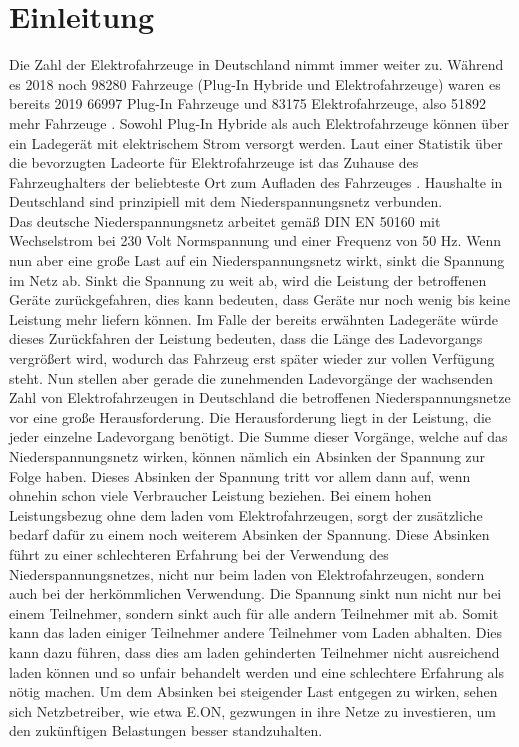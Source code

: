 \chapter{Einleitung}

Die Zahl der Elektrofahrzeuge in Deutschland nimmt immer weiter zu. Während es 2018 noch 98280 Fahrzeuge (Plug-In Hybride und Elektrofahrzeuge) waren es bereits 2019 66997 Plug-In Fahrzeuge und 83175 Elektrofahrzeuge, also 51892 mehr Fahrzeuge \cite{intro_stat_1}. Sowohl Plug-In Hybride als auch Elektrofahrzeuge können über ein Ladegerät mit elektrischem Strom versorgt werden. Laut einer Statistik über die bevorzugten Ladeorte für Elektrofahrzeuge ist das Zuhause des Fahrzeughalters der beliebteste Ort zum Aufladen des Fahrzeuges \cite{intro_stat_2}. Haushalte in Deutschland sind prinzipiell mit dem Niederspannungsnetz verbunden. \\
Das deutsche Niederspannungsnetz arbeitet gemäß DIN EN 50160 mit Wechselstrom bei 230 Volt Normspannung und einer Frequenz von 50 Hz. Wenn nun aber eine große Last auf ein Niederspannungsnetz wirkt, sinkt die Spannung im Netz ab. Sinkt die Spannung zu weit ab, wird die Leistung der betroffenen Geräte zurückgefahren, dies kann bedeuten, dass Geräte nur noch wenig bis keine Leistung mehr liefern können. Im Falle der bereits erwähnten Ladegeräte würde dieses Zurückfahren der Leistung bedeuten, dass die Länge des Ladevorgangs vergrößert wird, wodurch das Fahrzeug erst später wieder zur vollen Verfügung steht. Nun stellen aber gerade die zunehmenden Ladevorgänge der wachsenden Zahl von Elektrofahrzeugen in Deutschland die betroffenen Niederspannungsnetze vor eine große Herausforderung. Die Herausforderung liegt in der Leistung, die jeder einzelne Ladevorgang benötigt. Die Summe dieser Vorgänge, welche auf das Niederspannungsnetz wirken, können nämlich ein Absinken der Spannung zur Folge haben. Dieses Absinken der Spannung tritt vor allem dann auf, wenn ohnehin schon viele Verbraucher Leistung beziehen. Bei einem hohen Leistungsbezug ohne dem laden vom Elektrofahrzeugen, sorgt der zusätzliche bedarf dafür zu einem noch weiterem Absinken der Spannung. Diese Absinken führt zu einer schlechteren Erfahrung bei der Verwendung des Niederspannungsnetzes, nicht nur beim laden von Elektrofahrzeugen, sondern auch bei der herkömmlichen Verwendung. Die Spannung sinkt nun nicht nur bei einem Teilnehmer, sondern sinkt auch für alle andern Teilnehmer mit ab. Somit kann das laden einiger Teilnehmer andere Teilnehmer vom Laden abhalten. Dies kann dazu führen, dass dies am laden gehinderten Teilnehmer nicht ausreichend laden können und so unfair behandelt werden und eine schlechtere Erfahrung als nötig machen. Um dem Absinken bei steigender Last entgegen zu wirken, sehen sich Netzbetreiber, wie etwa E.ON, gezwungen in ihre Netze zu investieren, um den zukünftigen Belastungen besser standzuhalten. \\
